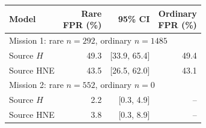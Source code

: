 \begin{tabular*}{\linewidth}{@{\extracolsep{\fill}}lrrr@{}}
\toprule
Model & \shortstack{Rare\\FPR (\%)} & 95\% CI & \shortstack{Ordinary\\FPR (\%)} \\
\midrule
\multicolumn{4}{l}{Mission 1: rare $n=292$, ordinary $n=1485$} \\
\midrule
Source $H$ & 49.3 & [33.9, 65.4] & 49.4 \\
Source HNE & 43.5 & [26.5, 62.0] & 43.1 \\
\midrule
\multicolumn{4}{l}{Mission 2: rare $n=552$, ordinary $n=0$} \\
\midrule
Source $H$ & 2.2 & [0.3, 4.9] & -- \\
Source HNE & 3.8 & [0.3, 8.9] & -- \\
\bottomrule
\end{tabular*}
